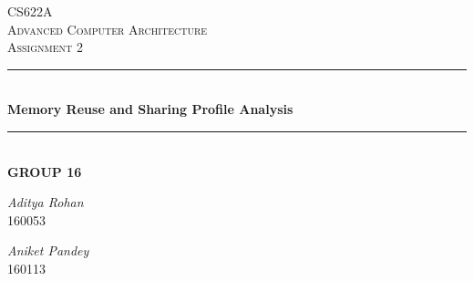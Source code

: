 \documentclass[12pt]{article}
\begin{document}
\begin{titlepage}
\newcommand{\HRule}{\rule{\linewidth}{0.1mm}} 
\center %
 
\textsc{\Large CS622A}\\[0.4cm] %
\textsc{\Large Advanced Computer Architecture}\\[0.4cm] %
\textsc{\large Assignment 2 }\\[0.4cm] %

\HRule \\[0.4cm]
{ \Large \bfseries Memory Reuse and Sharing Profile Analysis}\\[0.1cm] %
\HRule \\[0.5cm]
{ \large \bfseries GROUP 16}\\[1cm]
 

\begin{minipage}{0.4\textwidth}
\begin{flushleft} \large

\emph{Aditya Rohan}\\160053  %
\end{flushleft}
\begin{flushleft} \large

\emph{Aniket Pandey}\\160113  %
\end{flushleft}



\end{minipage}
\end{titlepage}
\end{document}
